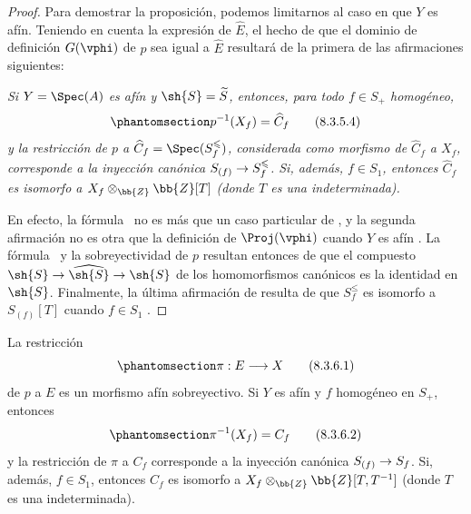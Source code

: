\documentclass[oneside,10pt]{amsart}
\makeatletter
\renewcommand{\leq}{\leqslant}
\newcommand{\ega@arrow}[2]{\mathchoice{#1}{#2}{#2}{#2}}
\renewcommand{\to}{\ega@arrow{\longrightarrow}{\rightarrow}}
\let\EGAOriginalLabel\label
\renewcommand{\label}[1]{\phantomsection\EGAOriginalLabel{#1}}
\makeatother
\begin{document}
\begin{proof}
Para demostrar la proposición, podemos limitarnos al caso en que $Y$ es afín.
Teniendo en cuenta la expresión  de $\widehat{E}$, el hecho de que el dominio de definición $G(\vphi)$ de $p$ sea igual a $\widehat{E}$ resultará de la primera de las afirmaciones siguientes:
\begin{env}[8.3.5.3]
\label{II.8.3.5.3}
\itshape Si $Y=\Spec(A)$ es afín y $\sh{S}=\widetilde{S}$, entonces, para todo $f\in S_+$ homogéneo,
\[
\label{II.8.3.5.4}
  p^{-1}(X_f) = \widehat{C}_f
\tag{8.3.5.4}
\]
y la restricción de $p$ a $\widehat{C}_f=\Spec(S_f^\leq)$, considerada como morfismo de $\widehat{C}_f$ a $X_f$, corresponde a la inyección canónica $S_{(f)}\to S_f^\leq$.
Si, además, $f\in S_1$, entonces $\widehat{C}_f$ es isomorfo a $X_f\otimes_{\bb{Z}}\bb{Z}[T]$ (donde $T$ es una indeterminada).
\end{env}

En efecto, la fórmula~ no es más que un caso particular de , y la segunda afirmación no es otra que la definición de $\Proj(\vphi)$ cuando $Y$ es afín .
La fórmula~ y la sobreyectividad de $p$ resultan entonces de que el compuesto $\sh{S}\to\widehat{\sh{S}}\to\sh{S}$ de los homomorfismos canónicos es la identidad en $\sh{S}$.
Finalmente, la última afirmación de  resulta de que $S_f^\leq$ es isomorfo a $S_{(f)}[T]$ cuando $f\in S_1$ .
\end{proof}
\begin{corollary}[8.3.6]
\label{II.8.3.6}
La restricción
\[
\label{II.8.3.6.1}
  \pi: E \to X
\tag{8.3.6.1}
\]
de $p$ a $E$ es un morfismo afín sobreyectivo.
Si $Y$ es afín y $f$ homogéneo en $S_+$, entonces
\[
\label{II.8.3.6.2}
  \pi^{-1}(X_f) = C_f
\tag{8.3.6.2}
\]
y la restricción de $\pi$ a $C_f$ corresponde a la inyección canónica $S_{(f)}\to S_f$.
Si, además, $f\in S_1$, entonces $C_f$ es isomorfo a $X_f\otimes_{\bb{Z}}\bb{Z}[T,T^{-1}]$ (donde $T$ es una indeterminada).
\end{corollary}
\end{document}
